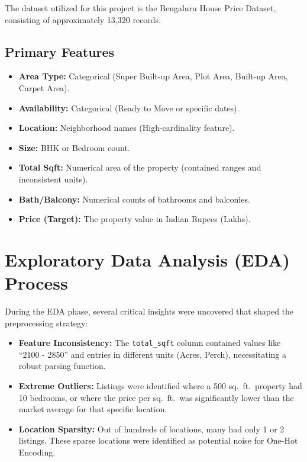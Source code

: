 \documentclass[12pt,a4paper]{article}
\begin{document}
The dataset utilized for this project is the Bengaluru House Price Dataset, consisting of approximately 13,320 records.

\subsection*{Primary Features}

\begin{itemize}
    \item \textbf{Area Type:} Categorical (Super Built-up Area, Plot Area, Built-up Area, Carpet Area).
    \item \textbf{Availability:} Categorical (Ready to Move or specific dates).
    \item \textbf{Location:} Neighborhood names (High-cardinality feature).
    \item \textbf{Size:} BHK or Bedroom count.
    \item \textbf{Total Sqft:} Numerical area of the property (contained ranges and inconsistent units).
    \item \textbf{Bath/Balcony:} Numerical counts of bathrooms and balconies.
    \item \textbf{Price (Target):} The property value in Indian Rupees (Lakhs).
\end{itemize}


\section{Exploratory Data Analysis (EDA) Process}

During the EDA phase, several critical insights were uncovered that shaped the preprocessing strategy:

\begin{itemize}
    \item \textbf{Feature Inconsistency:} The \texttt{total\_sqft} column contained values like ``2100 - 2850'' and entries in different units (Acres, Perch), necessitating a robust parsing function.
    \item \textbf{Extreme Outliers:} Listings were identified where a 500 sq.\ ft.\ property had 10 bedrooms, or where the price per sq.\ ft.\ was significantly lower than the market average for that specific location.
    \item \textbf{Location Sparsity:} Out of hundreds of locations, many had only 1 or 2 listings. These sparse locations were identified as potential noise for One-Hot Encoding.
\end{itemize}
\end{document}
